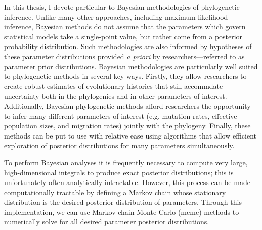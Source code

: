 In this thesis, I devote particular to Bayesian methodologies of phylogenetic inference. %
Unlike many other approaches, including maximum-likelihood inference, Bayesian methods do not assume that the parameters which govern statistical models take a single-point value, but rather come from a posterior probability distribution.
Such methodologies are also informed by hypotheses of these parameter distributions provided \textit{a priori} by researchers---referred to as parameter prior distributions.
Bayesian methodologies are particularly well suited to phylogenetic methods in several key ways.
Firstly, they allow researchers to create robust estimates of evolutionary histories that still accommdate uncertainty both in the phylogenies and in other parameters of interest. %
Additionally, Bayesian phylogenetic methods afford researchers the opportunity to infer many different parameters of interest (e.g. mutation rates, effective population sizes, and migration rates) jointly with the phylogeny.
Finally, these methods can be put to use with relative ease using algorithms that allow efficient exploration of posterior distributions for many parameters simultaneously. %

To perform Bayesian analyses it is frequently necessary to compute very large, high-dimensional integrals to produce exact posterior distributions; this is unfortunately often analytically intractable.
However, this process can be made computationally tractable by defining a Markov chain whose stationary distribution is the desired posterior distribution of parameters.
Through this implementation, we can use Markov chain Monte Carlo (\gls{mcmc}) methods to numerically solve for all desired parameter posterior distributions.

